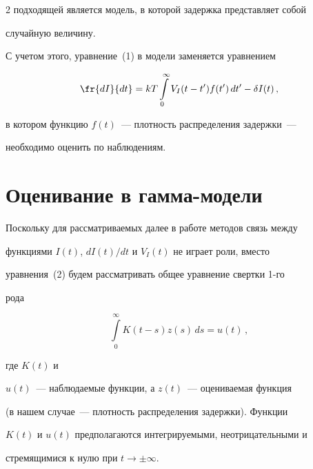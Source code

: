 \begin{multicols}{2}
подходящей является модель, в которой задержка представляет собой


случайную величину.





С учетом этого, уравнение~(1) в модели заменяется уравнением


\begin{equation}


\fr{dI}{dt}=kT\int\limits_0^\infty V_I(t-t')f(t')\,dt'-\delta I(t)\,,


\label{2us}


\end{equation}


в котором функцию $f(t)$~--- плотность распределения задержки~---


необходимо оценить по наблюдениям.





\section{Оценивание в гамма-модели}





Поскольку для рассматриваемых далее в работе методов связь между


функциями $I(t)$, $dI(t)/dt$ и $V_I(t)$ не играет роли, вместо


уравнения~(2) будем рассматривать общее уравнение свертки 1-го


рода 








\noindent


\begin{equation}


\int\limits_0^\infty K(t-s)z(s)\,ds=u(t)\,,


\label{3us}


\end{equation} 


где $K(t)$ и


$u(t)$~--- наблюдаемые функции, а $z(t)$~--- оцениваемая функция


(в нашем случае~--- плотность распределения задержки). Функции


$K(t)$ и $u(t)$ предполагаются интегрируемыми, неотрицательными и


стремящимися к нулю при $t \to \pm \infty$.






\end{multicols}
